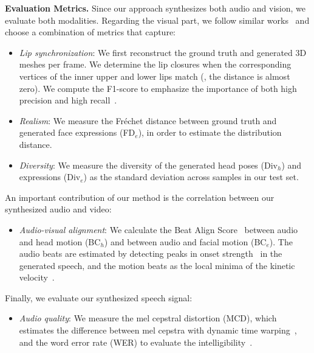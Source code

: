 \noindent
\textbf{Evaluation Metrics.} Since our approach synthesizes both audio and vision, we evaluate both modalities. Regarding the visual part, we follow similar works~\cite{ng2024audio2photoreal,richard2021meshtalk,richard2021audio} and choose a combination of metrics that capture:
\begin{itemize}
    \item \textit{Lip synchronization}: We first reconstruct the ground truth and generated 3D meshes per frame. We determine the lip closures when the corresponding vertices of the inner upper and lower lips match (\ie, the distance is almost zero). We compute the F1-score to emphasize the importance of both high precision and high recall~\cite{richard2021audio}.
    \item \textit{Realism}: We measure the Fr\'echet distance between ground truth and generated face expressions (FD$_{e}$), in order to estimate the distribution distance.
    \item \textit{Diversity}: We measure the diversity of the generated head poses (Div$_{h}$) and expressions (Div$_{e}$) as the standard deviation across samples in our test set. 
\end{itemize}
An important contribution of our method is the correlation between our synthesized audio and video:
\begin{itemize}
    \item \textit{Audio-visual alignment}: We calculate the Beat Align Score~\cite{zhang2023sadtalker,zhu2023taming,siyao2022bailando,li2021ai} between audio and head motion (BC$_{h}$) and between audio and facial motion (BC$_{e}$). The audio beats are estimated by detecting peaks in onset strength~\cite{ellis2007beat,mcfee2015librosa} in the generated speech, and the motion beats as the local minima of the kinetic velocity~\cite{li2021ai}.
\end{itemize}
Finally, we evaluate our synthesized speech signal:
\begin{itemize}
    \item \textit{Audio quality}: We measure the mel cepstral distortion (MCD), which estimates the difference between mel cepstra with dynamic time warping~\cite{lee2022bigvgan,Jang_2024_CVPR}, and the word error rate (WER) to evaluate the intelligibility~\cite{paszke2019pytorch,yang2021torchaudio}.
\end{itemize}

